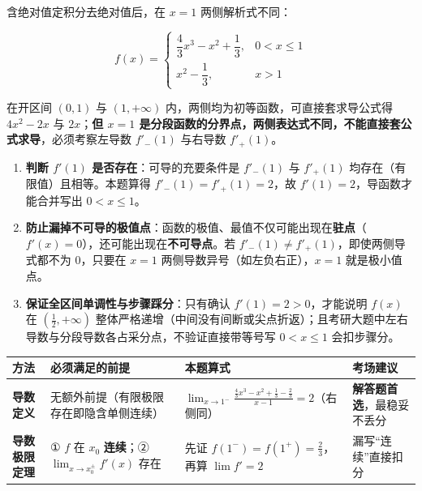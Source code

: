 \documentclass[12pt,a4paper]{ctexart}
\begin{document}

含绝对值定积分去绝对值后，在 $x=1$ 两侧解析式不同：

\[
f(x)=\begin{cases}\dfrac{4}{3}x^3-x^2+\dfrac{1}{3}, & 0<x\le 1\\[6pt] x^2-\dfrac{1}{3}, & x>1\end{cases}
\]

在开区间 $(0,1)$ 与 $(1,+\infty)$ 内，两侧均为初等函数，可直接套求导公式得 $4x^2-2x$ 与 $2x$；\textbf{但 $x=1$ 是分段函数的分界点，两侧表达式不同，不能直接套公式求导}，必须考察左导数 $f'_-(1)$ 与右导数 $f'_+(1)$。


\begin{enumerate}

\item \textbf{判断 $f'(1)$ 是否存在}：可导的充要条件是 $f'_-(1)$ 与 $f'_+(1)$ 均存在（有限值）且相等。本题算得 $f'_-(1)=f'_+(1)=2$，故 $f'(1)=2$，导函数才能合并写出 $0<x\le 1$。

\item \textbf{防止漏掉不可导的极值点}：函数的极值、最值不仅可能出现在\textbf{驻点}（$f'(x)=0$），还可能出现在\textbf{不可导点}。若 $f'_-(1)\ne f'_+(1)$，即使两侧导式都不为 $0$，只要在 $x=1$ 两侧导数异号（如左负右正），$x=1$ 就是极小值点。

\item \textbf{保证全区间单调性与步骤踩分}：只有确认 $f'(1)=2>0$，才能说明 $f(x)$ 在 $(\frac{1}{2},+\infty)$ 整体严格递增（中间没有间断或尖点折返）；且考研大题中左右导数与分段导数各占采分点，不验证直接带等号写 $0<x\le 1$ 会扣步骤分。

\end{enumerate}



\begin{center}\small
\begin{tabularx}{\linewidth}{@{}>{\raggedright\arraybackslash}X>{\raggedright\arraybackslash}X>{\raggedright\arraybackslash}X>{\raggedright\arraybackslash}X@{}}
\toprule
方法 & 必须满足的前提 & 本题算式 & 考场建议 \\
\midrule
\textbf{导数定义} & 无额外前提（有限极限存在即隐含单侧连续） & $\lim_{x\to 1^-}\frac{\frac{4}{3}x^3-x^2+\frac{1}{3}-\frac{2}{3}}{x-1}=2$（右侧同） & \textbf{解答题首选}，最稳妥不丢分 \\
\textbf{导数极限定理} & ① $f$ 在 $x_0$ \textbf{连续}；② $\lim_{x\to x_0^\pm}f'(x)$ 存在 & 先证 $f(1^-)=f(1^+)=\frac{2}{3}$，再算 $\lim f'=2$ & 漏写“连续”直接扣分 \\
\bottomrule
\end{tabularx}
\end{center}
\end{document}
